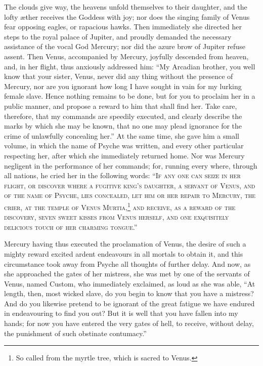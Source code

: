 \documentclass[12pt]{article}
\begin{document}
The clouds give way, the heavens unfold themselves to their daughter, and the
lofty {\ae}ther receives the Goddess with joy; nor does the singing family of
Venus fear opposing eagles, or rapacious hawks. Then immediately she directed
her steps to the royal palace of Jupiter, and proudly demanded the necessary
assistance of the vocal God Mercury; nor did the azure brow of Jupiter refuse
assent. Then Venus, accompanied by Mercury, joyfully descended from heaven,
and, in her flight, thus anxiously addressed him: ``My Arcadian brother, you
well know that your sister, Venus, never did any thing without the presence of
Mercury, nor are you ignorant how long I have sought in vain for my lurking
female slave. Hence nothing remains to be done, but for you to proclaim her in
a public manner, and propose a reward to him that shall find her. Take care,
therefore, that my commands are speedily executed, and clearly describe the
marks by which she may be known, that no one may plead ignorance for the crime
of unlawfully concealing her.'' At the same time, she gave him a small volume,
in which the name of Psyche was written, and every other particular respecting
her, after which she immediately returned home. Nor was Mercury negligent in
the performance of her commands; for, running every where, through all nations,
he cried her in the following words: \textsc{``If any one can seize in her
flight, or discover where a fugitive king's daughter, a servant of Venus, and
of the name of Psyche, lies concealed, let him or her repair to Mercury, the
crier, at the temple of Venus Murtia,\footnote{So called from the myrtle tree,
which is sacred to Venus.} and receive, as a reward of the discovery, seven
sweet kisses from Venus herself, and one exquisitely delicious touch of her
charming tongue.''}

Mercury having thus executed the proclamation of Venus, the desire of such a
mighty reward excited ardent endeavours in all mortals to obtain it, and this
circumstance took away from Psyche all thoughts of further delay. And now, as
she approached the gates of her mistress, she was met by one of the servants of
Venus, named Custom, who immediately exclaimed, as loud as she was able, ``At
length, then, most wicked slave, do you begin to know that you have a mistress?
And do you likewise pretend to be ignorant of the great fatigue we have endured
in endeavouring to find you out? But it is well that you have fallen into my
hands; for now you have entered the very gates of hell, to receive, without
delay, the punishment of such obstinate contumacy.''
\end{document}
